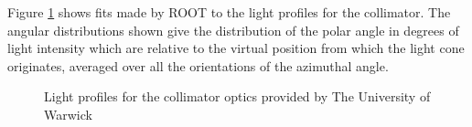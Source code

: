 Figure \ref{fig:collimator_TF1} shows fits made by ROOT to the light profiles for the collimator. The angular distributions shown give the distribution of the polar angle in degrees of light intensity which are relative to the virtual position from which the light cone originates, averaged over all the orientations of the azimuthal angle. 

\begin{figure}[!htbp]
    \centering
    
    \caption{Light profiles for the collimator optics provided by The University of Warwick}\label{fig:collimator_TF1}
    
    \hfill
    \hfill
    
    \hspace*{0.005\textwidth}%
    
\end{figure}

